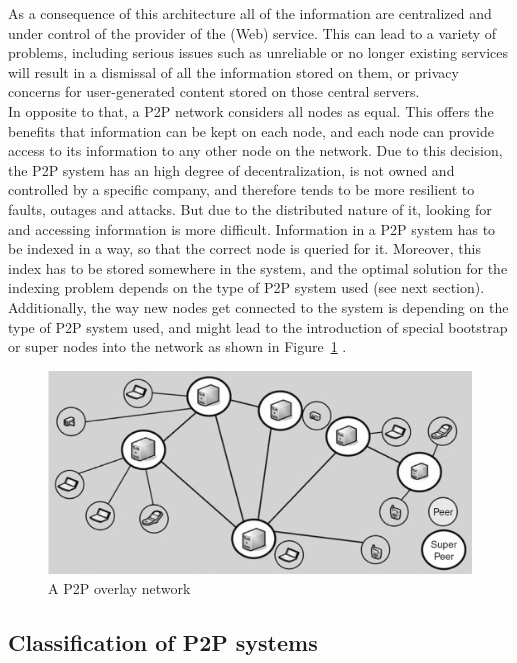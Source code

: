As a consequence of this architecture all of the information are centralized and under control of the provider of the (Web) service. This can lead to a variety of problems, including serious issues such as unreliable or no longer existing services will result in a dismissal of all the information stored on them, or privacy concerns for user-generated content stored on those central servers. \\

In opposite to that, a \gls{P2P} network considers all nodes as equal. This offers the benefits that information can be kept on each node, and each node can provide access to its information to any other node on the network. Due to this decision, the \gls{P2P} system has an high degree of decentralization, is not owned and controlled by a specific company, and therefore tends to be more resilient to faults, outages and attacks. But due to the distributed nature of it, looking for and accessing information is more difficult. Information in a \gls{P2P} system has to be indexed in a way, so that the correct node is queried for it. Moreover, this index has to be stored somewhere in the system, and the optimal solution for the indexing problem depends on the type of \gls{P2P} system used (see next section). Additionally, the way new nodes get connected to the system is depending on the type of \gls{P2P} system used, and might lead to the introduction of special bootstrap or super nodes into the network as shown in Figure~\ref{fig:p2p_overlay_network} \citep{parameswaran2001p2p}.

\begin{figure}[H]
	\centering
		\includegraphics[width=0.8\columnwidth]{images/p2p_network.png}
	\caption[A \gls{P2P} overlay network]{A \gls{P2P} overlay network \citep[pg. 9]{buford2009p2p}}
\label{fig:p2p_overlay_network}
\end{figure}


\subsection{Classification of \gls{P2P} systems}
\label{sec:p2p_classification}


